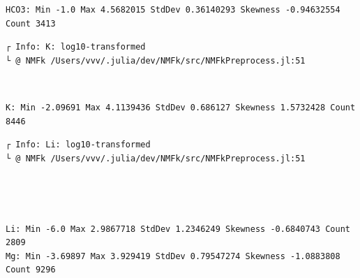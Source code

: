 \documentclass[11pt]{article}
\begin{document}
    \begin{Verbatim}[commandchars=\\\{\}]
HCO3: Min -1.0 Max 4.5682015 StdDev 0.36140293 Skewness -0.94632554 Count 3413
    \end{Verbatim}

    \begin{Verbatim}[commandchars=\\\{\}]
┌ Info: K: log10-transformed
└ @ NMFk /Users/vvv/.julia/dev/NMFk/src/NMFkPreprocess.jl:51
    \end{Verbatim}

    \begin{center}
    \end{center}
    { \hspace*{\fill} \\}
    
    \begin{Verbatim}[commandchars=\\\{\}]
K: Min -2.09691 Max 4.1139436 StdDev 0.686127 Skewness 1.5732428 Count 8446
    \end{Verbatim}

    \begin{Verbatim}[commandchars=\\\{\}]
┌ Info: Li: log10-transformed
└ @ NMFk /Users/vvv/.julia/dev/NMFk/src/NMFkPreprocess.jl:51
    \end{Verbatim}

    \begin{center}
    \end{center}
    { \hspace*{\fill} \\}
    
    \begin{center}
    \end{center}
    { \hspace*{\fill} \\}
    
    \begin{Verbatim}[commandchars=\\\{\}]
Li: Min -6.0 Max 2.9867718 StdDev 1.2346249 Skewness -0.6840743 Count 2809
Mg: Min -3.69897 Max 3.929419 StdDev 0.79547274 Skewness -1.0883808 Count 9296
    \end{Verbatim}
\end{document}
